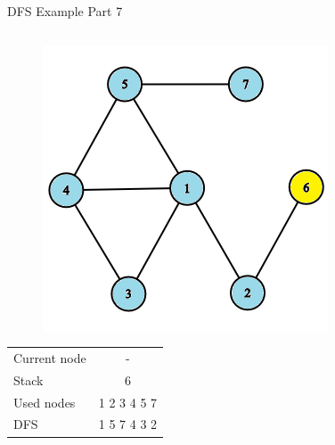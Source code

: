 \documentclass[aspectratio=169]{beamer}%
\begin{document}
\begin{frame}{DFS Example Part 7}
    \begin{columns}
        \begin{column}{0.32\textwidth}
            \begin{figure}[!ht]
                \centering
                \includegraphics[width=0.9\linewidth]{dfs 19.png}
            \end{figure}
            \begin{table}[ht]
                \centering
                \begin{tabular}{l c}
                    Current node & -\\
                    Stack & 6\\ 
                    Used nodes & 1 2 3 4 5 7\\
                    DFS & 1 5 7 4 3 2 
                \end{tabular}
            \end{table}
        \end{column}
        \hfill
        \begin{column}{0.32\textwidth}
            \begin{figure}[!ht]
                \centering

\end{figure}
\end{column}
\end{columns}
\end{frame}
\end{document}
